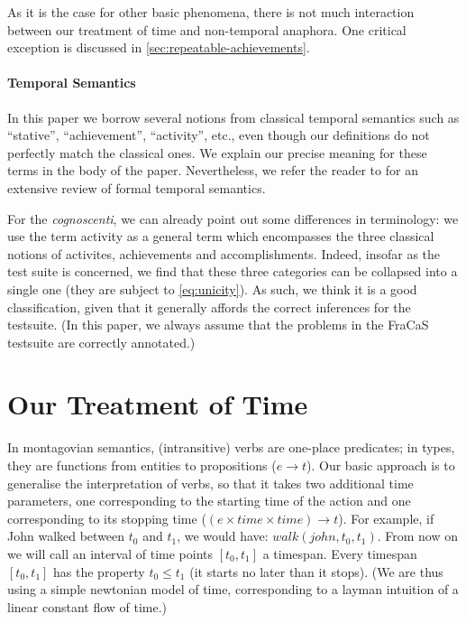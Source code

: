 \documentclass[a4paper,11pt]{article}
\begin{document}
As it is the case for other basic phenomena, there is not much
interaction between our treatment of time and non-temporal
anaphora. One critical exception is discussed in
\cref{sec:repeatable-achievements}.


\paragraph{Temporal Semantics}

In this paper we borrow several notions from classical temporal
semantics such as ``stative'', ``achievement'', ``activity'', etc.,
even though our definitions do not perfectly match the classical
ones. We explain our precise meaning for these terms in the body of the
paper. Nevertheless, we refer the reader to \citet{steedman:2000} for
an extensive review of formal temporal semantics.

For the \textit{cognoscenti}, we can already point out some
differences in terminology: we use the term activity as a general term
which encompasses the three classical notions of activites,
achievements and accomplishments. Indeed, insofar as the test suite is
concerned, we find that these three categories can be collapsed into a
single one (they are subject to \cref{eq:unicity}).  As such, we think
it is a good classification, given that it generally affords the
correct inferences for the testsuite. (In this paper, we always assume
that the problems in the FraCaS testsuite are correctly annotated.)


\section{Our Treatment of Time}
\label{sec:our-semantics}

In montagovian semantics, (intransitive) verbs are one-place
predicates; in types, they are functions from entities to propositions
($e \to t$).  Our basic approach is to generalise the interpretation of 
verbs, so that it takes two
additional time parameters, one corresponding to the starting time
of the action and one corresponding to its stopping time ($(e × time × time) \to t$). For example,
if John walked between $t_0$ and $t_1$, we would have:
$walk(john,t_0,t_1)$. From now on we will call an interval of time
points $[t_0,t_1]$ a timespan. Every timespan $[t_0,t_1]$ has the
property $t_0 ≤ t_1$ (it starts no later than it stops). (We are thus
using a simple newtonian model of time, corresponding to a layman
intuition of a linear constant flow of time.)
\end{document}
